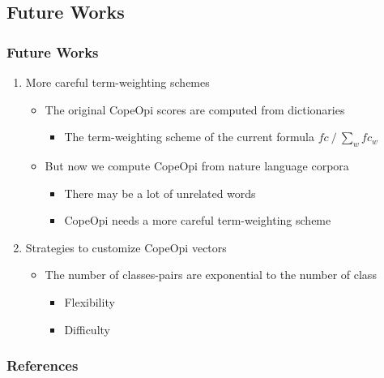 \documentclass[mathserif]{beamer}
\DeclareMathOperator*{\divby}{/}
\begin{document}
\subsection{Future Works}
\begin{frame}
\frametitle{Future Works}
	\begin{enumerate}
	\item More careful term-weighting schemes
		\begin{itemize}
		\item The original CopeOpi scores are computed from dictionaries
			\begin{itemize}
			\item The term-weighting scheme of the current formula $fc \divby \sum_{w}fc_w$
			\end{itemize}					
		 \item But now we compute CopeOpi from nature language corpora
		 	\begin{itemize}
			\item There may be a lot of unrelated words
			\item CopeOpi needs a more careful term-weighting scheme
			\end{itemize}
		\end{itemize}
	\item Strategies to customize CopeOpi vectors
		\begin{itemize}
		\item The number of classes-pairs are exponential to the number of class
			\begin{itemize}
			\item Flexibility
			\item Difficulty
			\end{itemize}
		\end{itemize}
	\end{enumerate}
\end{frame}

\begin{frame}[allowframebreaks]
	\frametitle{References}
	
	
\end{frame}
\end{document}
